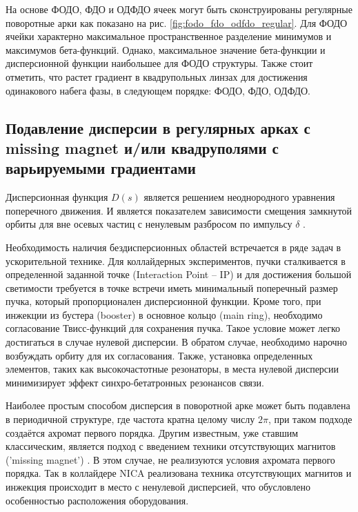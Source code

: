 \par На основе ФОДО, ФДО и ОДФДО ячеек могут быть сконструированы регулярные поворотные арки как показано на рис. \ref{fig:fodo_fdo_odfdo_regular}. Для ФОДО ячейки характерно максимальное пространственное разделение минимумов и максимумов бета-функций. Однако, максимальное значение бета-функции и дисперсионной функции наибольшее для ФОДО структуры. Также стоит отметить, что растет градиент в квадрупольных линзах для достижения одинакового набега фазы, в следующем порядке: ФОДО, ФДО, ОДФДО. 

	\subsection{Подавление дисперсии в регулярных арках с missing magnet и/или квадруполями с варьируемыми градиентами}\label{sec:transition_jump/suppression}

\par Дисперсионная функция $D(s)$ является решением неоднородного уравнения поперечного движения.
И является показателем зависимости смещения замкнутой орбиты для вне осевых частиц с ненулевым разбросом по импульсу $\delta$ \cite{lee}.

\par Необходимость наличия бездисперсионных областей встречается в ряде задач в ускорительной технике. Для коллайдерных экспериментов, пучки сталкивается в определенной заданной точке (Interaction Point -- IP) и для достижения большой светимости требуется в точке встречи иметь минимальный поперечный размер пучка, который пропорционален дисперсионной функции. Кроме того, при инжекции из бустера (booster) в основное кольцо (main ring), необходимо согласование Твисс-функций для сохранения пучка. Такое условие может легко достигаться в случае нулевой дисперсии. В обратом случае, необходимо нарочно возбуждать орбиту для их согласования. Также, установка определенных элементов, таких как высокочастотные резонаторы, в места нулевой дисперсии минимизирует эффект синхро-бетатронных резонансов связи.

\par Наиболее простым способом дисперсия в поворотной арке может быть подавлена в периодичной структуре, где частота кратна целому числу $2\pi$, при таком подходе создаётся ахромат первого порядка. Другим известным, уже ставшим классическим, является подход с введением техники отсутствующих магнитов ('missing magnet') \cite{autin:dispersion}. В этом случае, не реализуются условия ахромата первого порядка. Так в коллайдере NICA реализована техника отсутствующих магнитов и инжекция происходит в место с ненулевой дисперсией, что обусловлено особенностью расположения оборудования.


